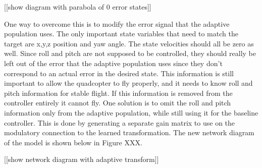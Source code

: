 \documentclass[letterpaper,12pt,titlepage,oneside,final]{book}
\begin{document}
[[show diagram with parabola of 0 error states]]

One way to overcome this is to modify the error signal that the adaptive population uses. The only important state variables that need to match the target are x,y,z position and yaw angle. The state velocities should all be zero as well. Since roll and pitch are not supposed to be controlled, they should really be left out of the error that the adaptive population uses since they don’t correspond to an actual error in the desired state. This information is still important to allow the quadcopter to fly properly, and it needs to know roll and pitch information for stable flight. If this information is removed from the controller entirely it cannot fly.
One solution is to omit the roll and pitch information only from the adaptive population, while still using it for the baseline controller. This is done by generating a separate gain matrix to use on the modulatory connection to the learned transformation. The new network diagram of the model is shown below in Figure XXX.

[[show network diagram with adaptive transform]]
\end{document}
